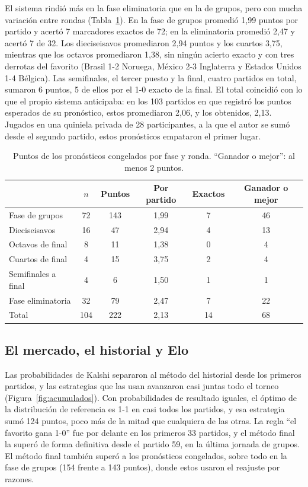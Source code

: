 \documentclass[12pt]{article}
\theoremstyle{plain}
\theoremstyle{remark}
\begin{document}
El sistema rindió más en la fase eliminatoria que en la de grupos,
pero con mucha variación entre rondas (Tabla~\ref{tab:puntos}).
En la fase de grupos promedió 1,99 puntos por partido y acertó 7
marcadores exactos de 72; en la eliminatoria promedió 2,47 y acertó 7
de 32.
Los dieciseisavos promediaron 2,94 puntos y los cuartos 3,75, mientras
que los octavos promediaron 1,38, sin ningún acierto exacto y con tres
derrotas del favorito (Brasil 1-2 Noruega, México 2-3 Inglaterra y
Estados Unidos 1-4 Bélgica).
Las semifinales, el tercer puesto y la final, cuatro partidos en
total, sumaron 6 puntos, 5 de ellos por el 1-0 exacto de la final.
El total coincidió con lo que el propio sistema anticipaba: en los 103
partidos en que registró los puntos esperados de su pronóstico, estos
promediaron 2,06, y los obtenidos, 2,13.
Jugados en una quiniela privada de 28 participantes, a la que el autor
se sumó desde el segundo partido, estos pronósticos empataron el primer
lugar.

\begin{table}[!htb]
\centering
\caption{Puntos de los pronósticos congelados por fase y ronda.
``Ganador o mejor'': al menos 2 puntos.}
\label{tab:puntos}
\begin{tabular}{lccccc}
\toprule
& $n$ & Puntos & Por partido & Exactos & Ganador o mejor \\
\midrule
Fase de grupos      & 72  & 143 & 1,99 &  7 & 46 \\
\addlinespace
Dieciseisavos       & 16  &  47 & 2,94 &  4 & 13 \\
Octavos de final    &  8  &  11 & 1,38 &  0 &  4 \\
Cuartos de final    &  4  &  15 & 3,75 &  2 &  4 \\
Semifinales a final & 4 & 6 & 1,50 & 1 & 1 \\
Fase eliminatoria   & 32  &  79 & 2,47 &  7 & 22 \\
\midrule
Total               & 104 & 222 & 2,13 & 14 & 68 \\
\bottomrule
\end{tabular}
\end{table}

\FloatBarrier
\subsection{El mercado, el historial y Elo}
\label{sec:comparacion}

Las probabilidades de Kalshi separaron al método del historial desde
los primeros partidos, y las estrategias que las usan avanzaron casi
juntas todo el torneo (Figura~\ref{fig:acumulados}).
Con probabilidades de resultado iguales, el óptimo de la distribución
de referencia es 1-1 en casi todos los partidos, y esa estrategia sumó
124 puntos, poco más de la mitad que cualquiera de las otras.
La regla ``el favorito gana 1-0'' fue por delante en los primeros 33
partidos, y el método final la superó de forma definitiva desde el
partido 59, en la última jornada de grupos.
El método final también superó a los pronósticos congelados, sobre
todo en la fase de grupos (154 frente a 143 puntos), donde estos
usaron el reajuste por razones.
\end{document}
